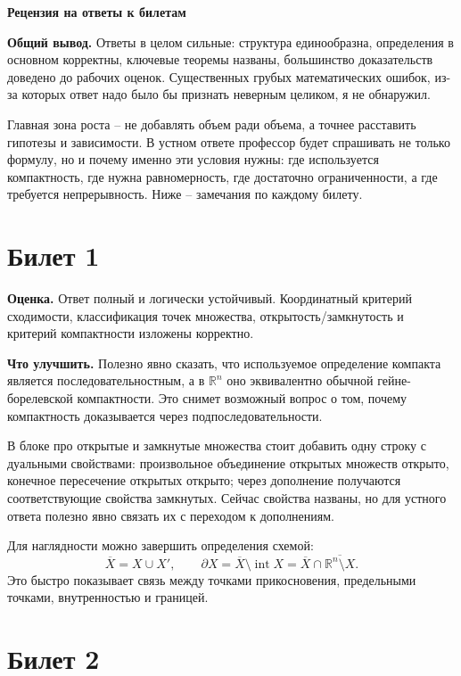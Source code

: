 \documentclass[12pt,a4paper]{article}
\newcommand{\R}{\mathbb{R}}
\begin{document}
\begin{center}
{\Large\bfseries Рецензия на ответы к билетам}
\end{center}

\textbf{Общий вывод.}
Ответы в целом сильные: структура единообразна, определения в основном
корректны, ключевые теоремы названы, большинство доказательств доведено до
рабочих оценок. Существенных грубых математических ошибок, из-за которых
ответ надо было бы признать неверным целиком, я не обнаружил.

Главная зона роста -- не добавлять объем ради объема, а точнее расставить
гипотезы и зависимости. В устном ответе профессор будет спрашивать не только
формулу, но и почему именно эти условия нужны: где используется компактность,
где нужна равномерность, где достаточно ограниченности, а где требуется
непрерывность. Ниже -- замечания по каждому билету.

\section*{Билет 1}

\textbf{Оценка.} Ответ полный и логически устойчивый. Координатный критерий
сходимости, классификация точек множества, открытость/замкнутость и критерий
компактности изложены корректно.

\textbf{Что улучшить.}
Полезно явно сказать, что используемое определение компакта является
последовательностным, а в \(\R^n\) оно эквивалентно обычной
гейне-борелевской компактности. Это снимет возможный вопрос о том, почему
компактность доказывается через подпоследовательности.

В блоке про открытые и замкнутые множества стоит добавить одну строку с
дуальными свойствами: произвольное объединение открытых множеств открыто,
конечное пересечение открытых открыто; через дополнение получаются
соответствующие свойства замкнутых. Сейчас свойства названы, но для устного
ответа полезно явно связать их с переходом к дополнениям.

Для наглядности можно завершить определения схемой:
\[
  \overline X=X\cup X',\qquad
  \partial X=\overline X\setminus\operatorname{int}X
  =\overline X\cap\overline{\R^n\setminus X}.
\]
Это быстро показывает связь между точками прикосновения, предельными точками,
внутренностью и границей.

\section*{Билет 2}
\end{document}
